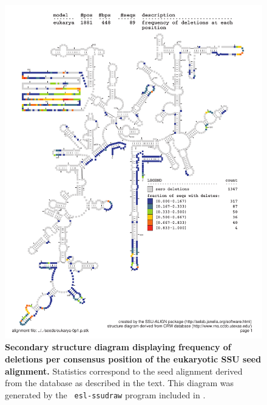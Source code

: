\begin{figure}
\begin{center}
\includegraphics[width=5.7in]{Figures/eukarya-0p1-dall}
\end{center}
\caption[Secondary structure diagram displaying frequency of deletions
  per consensus position of the eukaryotic SSU seed
  alignment]{\textbf{Secondary structure diagram displaying frequency 
  of deletions per consensus position of the eukaryotic SSU seed
  alignment.} Statistics correspond to the  seed
  alignment derived from the  database \cite{CannoneGutell02}
  as described in the text. This diagram was generated by the {\tt
  esl-ssudraw} program included in .}
\label{fig:eukdel}
\end{figure}


